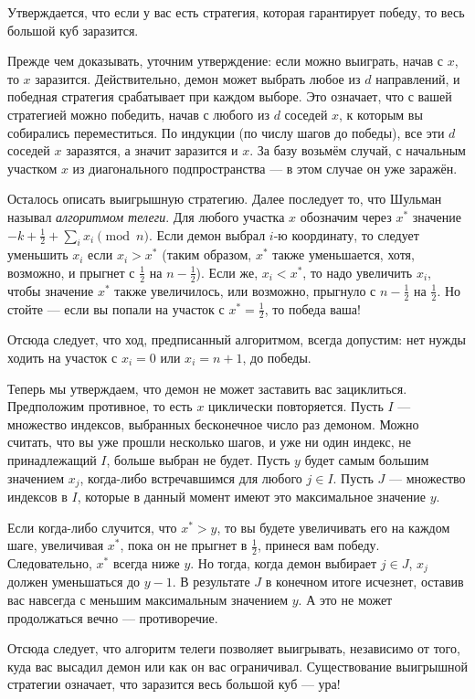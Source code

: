 Утверждается, что если у вас есть стратегия, которая гарантирует победу, то весь большой куб заразится.

Прежде чем доказывать, уточним утверждение: если можно выиграть, начав с $x$, то $x$ заразится.
Действительно, демон может выбрать любое из $d$ направлений,
и победная стратегия срабатывает при каждом выборе.
Это означает, что с вашей стратегией можно победить, начав с любого из $d$ соседей $x$, к которым вы собирались переместиться.
По индукции (по числу шагов до победы), все эти $d$ соседей $x$ заразятся, а значит заразится и $x$.
За базу возьмём случай, с начальным участком $x$ из диагонального подпространства --- в этом случае он уже заражён.

Осталось описать выигрышную стратегию.
Далее последует то, что Шульман называл \emph{алгоритмом телеги}.
Для любого участка $x$ обозначим через $x^*$ значение $-k + \tfrac12 + \sum_i x_i \pmod n$.
Если демон выбрал $i$-ю координату, то следует уменьшить $x_i$ если $x_i > x^*$ (таким образом, $x^*$ также уменьшается, хотя, возможно, и прыгнет с $\tfrac12$ на $n - \tfrac12$).
Если же, $x_i < x^*$, то надо увеличить $x_i$, чтобы значение $x^*$ также увеличилось, или возможно, прыгнуло с $n - \tfrac12$ на $\tfrac12$.
Но стойте --- если вы попали на участок с $x^* = \tfrac12$, то победа ваша!

Отсюда следует, что ход, предписанный алгоритмом, всегда допустим:
нет нужды ходить на участок с $x_i = 0$ или $x_i = n + 1$, до победы.

Теперь мы утверждаем, что демон не может заставить вас зациклиться.
Предположим противное, то есть $x$ циклически повторяется.
Пусть $I$ --- множество индексов, выбранных бесконечное число раз демоном.
Можно считать, что вы уже прошли несколько шагов, и уже ни один индекс, не принадлежащий $I$, больше выбран не будет.
Пусть $y$ будет самым большим значением $x_j$, когда-либо встречавшимся для любого $j \in I$.
Пусть $J$ --- множество индексов в $I$, которые в данный момент имеют это максимальное значение $y$.

Если когда-либо случится, что $x^* > y$, то вы будете увеличивать его на каждом шаге, увеличивая $x^*$, пока он не прыгнет в $\tfrac12$, принеся вам победу.
Следовательно, $x^*$ всегда ниже $y$.
Но тогда, когда демон выбирает $j \in J$, $x_j$ должен уменьшаться до $y - 1$.
В результате $J$ в конечном итоге исчезнет, оставив вас навсегда с меньшим максимальным значением $y$.
А это не может продолжаться вечно --- противоречие.

Отсюда следует, что алгоритм телеги позволяет выигрывать, независимо от того, куда вас высадил демон или как он вас ограничивал.
Существование выигрышной стратегии означает, что заразится весь большой куб --- ура!

